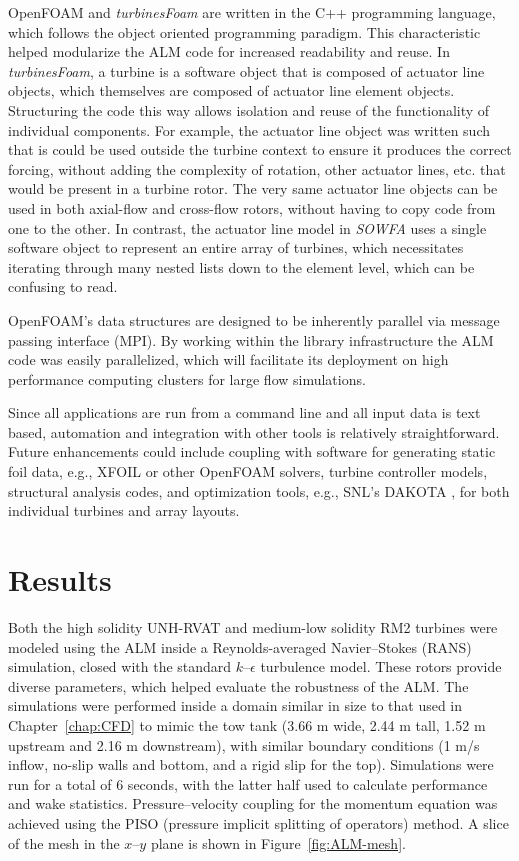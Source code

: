 OpenFOAM and \textit{turbinesFoam} are written in the C++ programming language,
which follows the object oriented programming paradigm. This characteristic
helped modularize the ALM code for increased readability and reuse. In
\textit{turbinesFoam}, a turbine is a software object that is composed of
actuator line objects, which themselves are composed of actuator line element
objects. Structuring the code this way allows isolation and reuse of the
functionality of individual components. For example, the actuator line object
was written such that is could be used outside the turbine context to ensure it
produces the correct forcing, without adding the complexity of rotation, other
actuator lines, etc. that would be present in a turbine rotor. The very same
actuator line objects can be used in both axial-flow and cross-flow rotors,
without having to copy code from one to the other. In contrast, the actuator
line model in \textit{SOWFA} uses a single software object to represent an
entire array of turbines, which necessitates iterating through many nested lists
down to the element level, which can be confusing to read.

OpenFOAM's data structures are designed to be inherently parallel via message
passing interface (MPI). By working within the library infrastructure the ALM
code was easily parallelized, which will facilitate its deployment on high
performance computing clusters for large flow simulations.

Since all applications are run from a command line and all input data is text
based, automation and integration with other tools is relatively
straightforward. Future enhancements could include coupling with software for
generating static foil data, e.g., XFOIL or other OpenFOAM solvers, turbine
controller models, structural analysis codes, and optimization tools, e.g.,
SNL's DAKOTA \cite{AdamsBaumanBohnhoffEtAl2009}, for both individual turbines
and array layouts.


\section{Results}

Both the high solidity UNH-RVAT and medium-low solidity RM2 turbines were
modeled using the ALM inside a Reynolds-averaged Navier--Stokes (RANS)
simulation, closed with the standard $k$--$\epsilon$ turbulence model. These
rotors provide diverse parameters, which helped evaluate the robustness of the
ALM. The simulations were performed inside a domain similar in size to that used
in Chapter~\ref{chap:CFD} to mimic the tow tank (3.66 m wide, 2.44 m tall, 1.52
m upstream and 2.16 m downstream), with similar boundary conditions (1 m/s
inflow, no-slip walls and bottom, and a rigid slip for the top). Simulations
were run for a total of 6 seconds, with the latter half used to calculate
performance and wake statistics. Pressure--velocity coupling for the momentum
equation was achieved using the PISO (pressure implicit splitting of operators)
method. A slice of the mesh in the $x$--$y$ plane is shown in
Figure~\ref{fig:ALM-mesh}.

